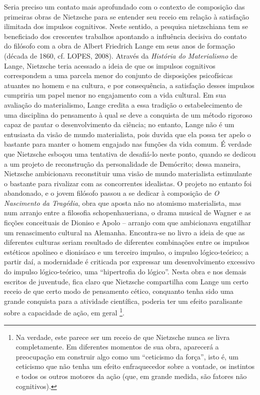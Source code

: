 \documentclass[
	12pt,				%
	openright,			%
	oneside,			%
	a4paper,			%
	english,			%
	french,				%
	spanish,			%
	brazil				%
	]{abntex2}
\begin{document}
	Seria preciso um contato mais aprofundado com o contexto de composição das primeiras obras de Nietzsche para se entender seu receio em relação à satisfação ilimitada dos impulsos cognitivos. Neste sentido, a pesquisa nietzschiana tem se beneficiado dos crescentes trabalhos apontando a influência decisiva do contato do filósofo com a obra de Albert Friedrich Lange em seus anos de formação (década de 1860, cf. LOPES, 2008). Através da \textit{História do Materialismo} de Lange, Nietzsche teria acessado a ideia de que os impulsos cognitivos correspondem a uma parcela menor do conjunto de disposições psicofísicas atuantes no homem e na cultura, e por consequência, a satisfação desses impulsos cumpriria um papel menor no engajamento com a vida cultural. Em sua avaliação do materialismo, Lange credita a essa tradição o estabelecimento de uma disciplina do pensamento à qual se deve a conquista de um método rigoroso capaz de pautar o desenvolvimento da ciência; no entanto, Lange não é um entusiasta da visão de mundo materialista, pois duvida que ela possa ter apelo o bastante para manter o homem engajado nas funções da vida comum. É verdade que Nietzsche esboçou uma tentativa de desafiá-lo neste ponto, quando se dedicou a um projeto de reconstrução da personalidade de Demócrito; dessa maneira, Nietzsche ambicionava reconstituir uma visão de mundo materialista estimulante o bastante para rivalizar com as concorrentes idealistas. O projeto no entanto foi abandonado, e o jovem filósofo passou a se dedicar à composição de \textit{O Nascimento da Tragédia}, obra que aposta não no atomismo materialista, mas num arranjo entre a filosofia schopenhaueriana, o drama musical de Wagner e as ficções conceituais de Dioniso e Apolo – arranjo com que ambicionava engatilhar um renascimento cultural na Alemanha. Encontra-se no livro a ideia de que as diferentes culturas seriam resultado de diferentes combinações entre os impulsos estéticos apolíneo e dionisíaco e um terceiro impulso, o impulso lógico-teórico; a partir daí, a modernidade é criticada por expressar um desenvolvimento excessivo do impulso lógico-teórico, uma “hipertrofia do lógico”. Nesta obra e nos demais escritos de juventude, fica claro que Nietzsche compartilha com Lange um certo receio de que certo modo de pensamento cético, conquanto tenha sido uma grande conquista para a atividade científica, poderia ter um efeito paralisante sobre a capacidade de ação, em geral
\footnote{Na verdade, este parece ser um receio de que Nietzsche nunca se livra completamente. Em diferentes momentos de sua obra, aparecerá a preocupação em construir algo como um “ceticismo da força”, isto é, um ceticismo que não tenha um efeito enfraquecedor sobre a vontade, os instintos e todos os outros motores da ação (que, em grande medida, são fatores não cognitivos).}. 
\end{document}
